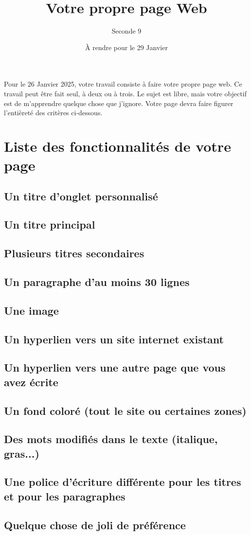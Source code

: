 \documentclass{article}
\title{Votre propre page Web}
\date{À rendre pour le 29 Janvier}
\author{Seconde 9}
\begin{document}
\maketitle

\begin{tcolorbox}
Pour le 26 Janvier 2025, votre travail consiste à faire votre propre page web. Ce travail peut être fait seul, à deux ou à trois. Le sujet est libre, mais votre objectif est de m'apprendre quelque chose que j'ignore. Votre page devra faire figurer l'entièreté des critères ci-dessous.
\end{tcolorbox}

\section*{Liste des fonctionnalités de votre page}
\subsection*{Un titre d'onglet personnalisé}
\subsection*{Un titre principal}
\subsection*{Plusieurs titres secondaires}
\subsection*{Un paragraphe d'au moins 30 lignes}
\subsection*{Une image}
\subsection*{Un hyperlien vers un site internet existant}
\subsection*{Un hyperlien vers une autre page que vous avez écrite}
\subsection*{Un fond coloré (tout le site ou certaines zones)}
\subsection*{Des mots modifiés dans le texte (italique, gras...)}
\subsection*{Une police d'écriture différente pour les titres et pour les paragraphes}
\subsection*{Quelque chose de joli de préférence}
\end{document}
